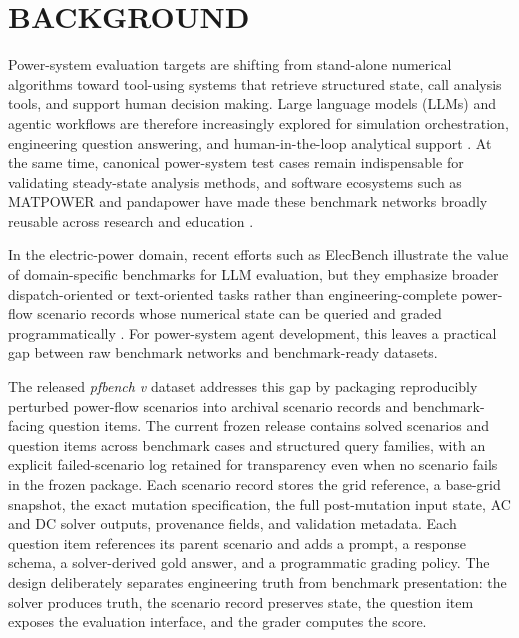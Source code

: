 \section*{BACKGROUND}

Power-system evaluation targets are shifting from stand-alone numerical algorithms toward tool-using systems that retrieve structured state, call analysis tools, and support human decision making. Large language models (LLMs) and agentic workflows are therefore increasingly explored for simulation orchestration, engineering question answering, and human-in-the-loop analytical support \cite{liu2023agentbench,jia2024enhancing}. At the same time, canonical power-system test cases remain indispensable for validating steady-state analysis methods, and software ecosystems such as MATPOWER and pandapower have made these benchmark networks broadly reusable across research and education \cite{zimmerman2011matpower,thurner2018pandapower}.

In the electric-power domain, recent efforts such as ElecBench illustrate the value of domain-specific benchmarks for LLM evaluation, but they emphasize broader dispatch-oriented or text-oriented tasks rather than engineering-complete power-flow scenario records whose numerical state can be queried and graded programmatically \cite{zhou2024elecbench}. For power-system agent development, this leaves a practical gap between raw benchmark networks and benchmark-ready datasets.

The released \textit{pfbench v\datasetversion} dataset addresses this gap by packaging reproducibly perturbed power-flow scenarios into archival scenario records and benchmark-facing question items. The current frozen release contains \datasetscenarios{} solved scenarios and \datasetquestions{} question items across \datasetcases{} benchmark cases and \datasetfamilies{} structured query families, with an explicit failed-scenario log retained for transparency even when no scenario fails in the frozen package. Each scenario record stores the grid reference, a base-grid snapshot, the exact mutation specification, the full post-mutation input state, AC and DC solver outputs, provenance fields, and validation metadata. Each question item references its parent scenario and adds a prompt, a response schema, a solver-derived gold answer, and a programmatic grading policy. The design deliberately separates engineering truth from benchmark presentation: the solver produces truth, the scenario record preserves state, the question item exposes the evaluation interface, and the grader computes the score.

